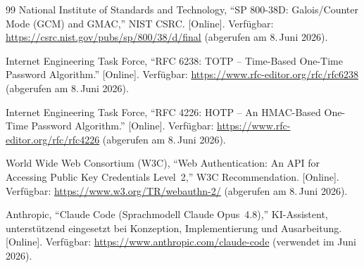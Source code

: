 \documentclass[11pt,a4paper]{article}
\begin{document}
\begin{thebibliography}{99}
 National Institute of Standards and Technology, ``SP 800-38D:
Galois/Counter Mode (GCM) and GMAC,'' NIST CSRC. [Online]. Verfügbar:
\url{https://csrc.nist.gov/pubs/sp/800/38/d/final} (abgerufen am 8.\,Juni 2026).

 Internet Engineering Task Force, ``RFC 6238: TOTP --
Time-Based One-Time Password Algorithm.'' [Online]. Verfügbar:
\url{https://www.rfc-editor.org/rfc/rfc6238} (abgerufen am 8.\,Juni 2026).

 Internet Engineering Task Force, ``RFC 4226: HOTP -- An
HMAC-Based One-Time Password Algorithm.'' [Online]. Verfügbar:
\url{https://www.rfc-editor.org/rfc/rfc4226} (abgerufen am 8.\,Juni 2026).

 World Wide Web Consortium (W3C), ``Web Authentication: An API
for Accessing Public Key Credentials Level~2,'' W3C Recommendation. [Online].
Verfügbar: \url{https://www.w3.org/TR/webauthn-2/} (abgerufen am 8.\,Juni 2026).

 Anthropic, ``Claude Code (Sprachmodell Claude Opus~4.8),''
KI-Assistent, unterstützend eingesetzt bei Konzeption, Implementierung und
Ausarbeitung. [Online]. Verfügbar: \url{https://www.anthropic.com/claude-code}
(verwendet im Juni 2026).

\end{thebibliography}
\end{document}
